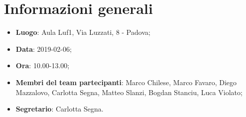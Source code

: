 \section{Informazioni generali}

\begin{itemize}
	\item \textbf{Luogo}: Aula Luf1, Via Luzzati, 8 - Padova; 
	\item \textbf{Data}: 2019-02-06; 
	\item \textbf{Ora}: 10.00-13.00; 
	\item \textbf{Membri del team partecipanti}: Marco Chilese, Marco Favaro, Diego Mazzalovo, Carlotta Segna, Matteo Slanzi, Bogdan Stanciu, Luca Violato; 
	\item \textbf{Segretario}: Carlotta Segna. 
\end{itemize}